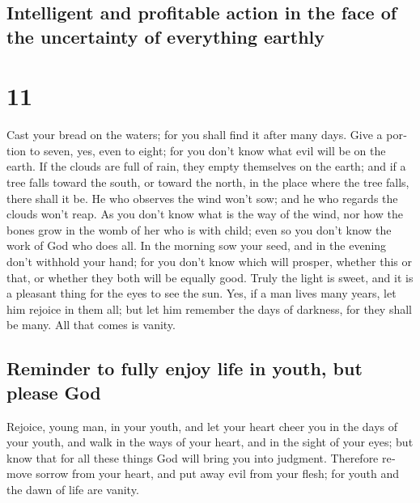 \begin{paracol}{2}
\switchcolumn
\begin{otherlanguage}{english}

\hypertarget{intelligent-and-profitable-action-in-the-face-of-the-uncertainty-of-everything-earthly}{%
\subsection{Intelligent and profitable action in the face of the
uncertainty of everything
earthly}\label{intelligent-and-profitable-action-in-the-face-of-the-uncertainty-of-everything-earthly}}

\hypertarget{section-21}{%
\section{11}\label{section-21}}

 Cast your bread on the waters; for you shall find it
after many days.  Give a portion to seven, yes, even to
eight; for you don't know what evil will be on the earth. 
If the clouds are full of rain, they empty themselves on the earth; and
if a tree falls toward the south, or toward the north, in the place
where the tree falls, there shall it be.  He who observes
the wind won't sow; and he who regards the clouds won't reap.
 As you don't know what is the way of the wind, nor how
the bones grow in the womb of her who is with child; even so you don't
know the work of God who does all.  In the morning sow
your seed, and in the evening don't withhold your hand; for you don't
know which will prosper, whether this or that, or whether they both will
be equally good.  Truly the light is sweet, and it is a
pleasant thing for the eyes to see the sun.  Yes, if a man
lives many years, let him rejoice in them all; but let him remember the
days of darkness, for they shall be many. All that comes is vanity.

\hypertarget{reminder-to-fully-enjoy-life-in-youth-but-please-god}{%
\subsection{Reminder to fully enjoy life in youth, but please
God}\label{reminder-to-fully-enjoy-life-in-youth-but-please-god}}

 Rejoice, young man, in your youth, and let your heart
cheer you in the days of your youth, and walk in the ways of your heart,
and in the sight of your eyes; but know that for all these things God
will bring you into judgment.  Therefore remove sorrow
from your heart, and put away evil from your flesh; for youth and the
dawn of life are vanity.


\end{otherlanguage}
\end{paracol}

